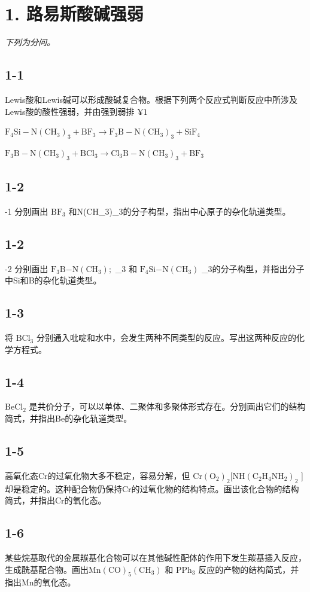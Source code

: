 \section*{1. 路易斯酸碱强弱}
\textit{下列为分问。}

\subsection*{1-1}
Lewis酸和Lewis碱可以形成酸碱复合物。根据下列两个反应式判断反应中所涉及Lewis酸的酸性强弱，并由强到弱排 $\yen 1$

$
\mathrm{F} _ {4} \mathrm{Si} - \mathrm{N} (\mathrm{CH} _ {3}) _ {3} + \mathrm{BF} _ {3} \rightarrow \mathrm{F} _ {3} \mathrm{B} - \mathrm{N} (\mathrm{CH} _ {3}) _ {3} + \mathrm{SiF} _ {4}
$

$
\mathrm{F} _ {3} \mathrm{B} - \mathrm{N} (\mathrm{CH} _ {3}) _ {3} + \mathrm{BCl} _ {3} \rightarrow \mathrm{Cl} _ {3} \mathrm{B} - \mathrm{N} (\mathrm{CH} _ {3}) _ {3} + \mathrm{BF} _ {3}
$

\subsection*{1-2}
-1 分别画出 $\mathrm { B F _ { 3 } }$ 和N(CH_{3})_{3}的分⼦构型，指出中⼼原⼦的杂化轨道类型。

\subsection*{1-2}
-2 分别画出 $\mathrm { F _ { 3 } B { \mathrm { - N } } ( C H _ { 3 } ) } ;$ _{3} 和 $\mathrm { F _ { 4 } S i \mathrm { - N ( C H _ { 3 } ) } }$ _{3}的分⼦构型，并指出分⼦中Si和B的杂化轨道类型。

\subsection*{1-3}
将 $\mathrm { B C l _ { 3 } }$ 分别通⼊吡啶和⽔中，会发⽣两种不同类型的反应。写出这两种反应的化学⽅程式。

\subsection*{1-4}
$\mathrm { B e C l _ { 2 } }$ 是共价分⼦，可以以单体、⼆聚体和多聚体形式存在。分别画出它们的结构简式，并指出Be的杂化轨道类型。

\subsection*{1-5}
⾼氧化态Cr的过氧化物⼤多不稳定，容易分解，但 $\mathrm { C r ( O _ { 2 } ) _ { 2 } [ N H ( C _ { 2 } H _ { 4 } N H _ { 2 } ) _ { 2 } }$ ]却是稳定的。这种配合物仍保持Cr的过氧化物的结构特点。画出该化合物的结构简式，并指出Cr的氧化态。

\subsection*{1-6}
某些烷基取代的⾦属羰基化合物可以在其他碱性配体的作⽤下发⽣羰基插⼊反应，⽣成酰基配合物。画出$\mathrm { M n ( C O ) _ { 5 } ( C H _ { 3 } ) }$ 和 $\mathrm { P P h _ { 3 } }$ 反应的产物的结构简式，并指出Mn的氧化态。
